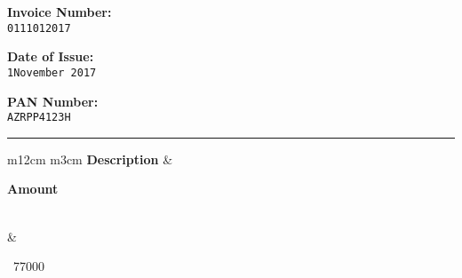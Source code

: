 \documentclass[]{invoice-style}
\begin{document}
\begin{minipage}[t][60em][c]{\textwidth}
\begin{minipage}[][17em][c]{\textwidth}
\begin{minipage}[c][13em][t]{.49\textwidth}
\begin{minipage}[][][c]{.9\textwidth}\begin{center}{\bfseries \Large Invoice Number:}\vspace{.25cm}\\{\Large {\tt 0111012017}}\end{center}
\end{minipage}
\vfill
\begin{minipage}[][][c]{.9\textwidth}\begin{center}{\bfseries \Large Date of Issue:}\vspace{.25cm}\\{\Large {\tt 1November 2017}}\end{center}
\end{minipage}
\vfill
\begin{minipage}[][][c]{.9\textwidth}\begin{center}{\bfseries \Large PAN Number:}\vspace{.25cm}\\{\Large {\tt AZRPP4123H}}\end{center}
\end{minipage}
\end{minipage}
\end{minipage}
\hrule
	\begin{minipage}[][][t]{\textwidth}
\begin{tabular}{  m{12cm}  m{3cm}  } 
{\bfseries \Large Description} & \begin{center}{\bfseries \Large Amount}\end{center}  \\ 
 & \begin{center}{\large\rupee~77000}\end{center} \\ 
\end{tabular}
\vspace{.35cm}\\


\end{minipage}
\end{minipage}
\end{document}
